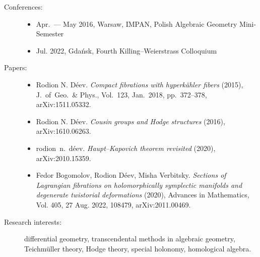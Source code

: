 \documentclass{article}
\begin{document}
\begin{description}

\item[Conferences:] \begin{itemize}
\item Apr.~--- May 2016,  Warsaw,  IMPAN,  Polish Algebraic Geometry Mini-Semester
\item Jul.  2022,  Gda\'nsk,  Fourth Killing--Weierstrass Colloquium
\end{itemize}


\item[Papers:] \begin{itemize}
     \item Rodion N. D\'eev. {\em 
     Compact fibrations with hyperk\"ahler fibers} (2015), J.~of~Geo.~\& Phys., 
     Vol.~123, Jan.~2018, pp.~372--378, arXiv:1511.05332.
     \item Rodion N. D\'eev. {\em
     Cousin groups and Hodge structures} (2016), arXiv:1610.06263.
     \item rodion~n.~d\'eev. {\em Haupt--Kapovich theorem revisited} (2020),
     arXiv:2010.15359.
     \item Fedor Bogomolov, Rodion D\'eev, Misha Verbitsky. {\em 
     Sections of Lagrangian fibrations on holomorphically symplectic manifolds 
     and degenerate twistorial deformations} (2020),  Advances in Mathematics, 
     Vol.  405,  27 Aug.  2022,  108479,  arXiv:2011.00469.
\end{itemize}

\item[Research interests:] differential geometry, transcendental methods in 
algebraic geometry, Teichm\"uller theory, Hodge theory, special holonomy, 
homological algebra.


\end{description}
\end{document}
